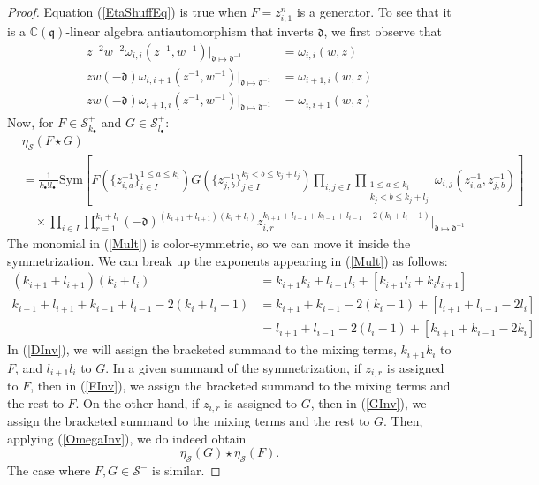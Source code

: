\documentclass{amsart}
\newcommand{\C}{\mathbb{C}}
\newcommand{\qqq}{\mathfrak{q}}
\newcommand{\ddd}{\mathfrak{d}}
\theoremstyle{remark}
\numberwithin{thm}{section}
\numberwithin{equation}{section}
\begin{document}
\begin{proof}
Equation (\ref{EtaShuffEq}) is true when $F=z_{i,1}^n$ is a generator.
To see that it is a $\C(\qqq)$-linear algebra antiautomorphism that inverts $\ddd$, we first observe that
\begin{equation}
 \begin{aligned}
    z^{-2}w^{-2}\omega_{i,i}(z^{-1},w^{-1})\bigg|_{\ddd\mapsto\ddd^{-1}}&=\omega_{i,i}(w,z)\\
    zw(-\ddd)\omega_{i,i+1}(z^{-1},w^{-1})\bigg|_{\ddd\mapsto\ddd^{-1}}&=\omega_{i+1,i}(w,z)\\
    zw(-\ddd)\omega_{i+1,i}(z^{-1}, w^{-1})\bigg|_{\ddd\mapsto\ddd^{-1}}&=\omega_{i,i+1}(w,z)
\end{aligned} 
\label{OmegaInv}
\end{equation}
Now, for $F\in\mathcal{S}_{k_\bullet}^+$ and $G\in\mathcal{S}_{l_\bullet}^+$:
\begin{align}
        \nonumber
        &\eta_{\mathcal{S}}(F\star G)\\
        \nonumber
        &=\frac{1}{k_\bullet!l_\bullet!}\mathrm{Sym}\left[F\left(\{z_{i,a}^{-1}\}_{i\in I}^{1\le a\le k_i}\right)
        G\left(\{z_{j,b}^{-1}\}_{j\in I}^{k_j<b\le k_j+l_j}\right)
        \prod_{i,j\in I}\prod_{\substack{1\le a\le k_i\\k_j<b\le k_j+l_j}}\omega_{i,j}(z_{i,a}^{-1},z_{j,b}^{-1})\right]\\
        \label{Mult}
        &\quad\times
        \prod_{i\in I}\prod_{r=1}^{k_i+l_i}(-\ddd)^{(k_{i+1}+l_{i+1})(k_i+l_i)} z_{i,r}^{k_{i+1}+l_{i+1}+k_{i-1}+l_{i-1}-2(k_i+l_i-1)}\bigg|_{\ddd\mapsto\ddd^{-1}}
\end{align}
The monomial in (\ref{Mult}) is color-symmetric, so we can move it inside the symmetrization.
We can break up the exponents appearing in (\ref{Mult}) as follows:
\begin{align}
\label{DInv}
    (k_{i+1}+l_{i+1})(k_i+l_i)&=k_{i+1}k_{i}+l_{i+1}l_i+\left[k_{i+1}l_i+k_il_{i+1}\right]\\
\label{FInv}
    k_{i+1}+l_{i+1}+k_{i-1}+l_{i-1}-2(k_i+l_i-1)&=k_{i+1}+k_{i-1}-2(k_i-1)+[l_{i+1}+l_{i-1}-2l_i]\\
\label{GInv}
    &=l_{i+1}+l_{i-1}-2(l_i-1)+[k_{i+1}+k_{i-1}-2k_i]
\end{align}
In (\ref{DInv}), we will assign the bracketed summand to the mixing terms, $k_{i+1}k_{i}$ to $F$, and $l_{i+1}l_i$ to $G$.
In a given summand of the symmetrization, if $z_{i,r}$ is assigned to $F$, then in (\ref{FInv}), we assign the bracketed summand to the mixing terms and the rest to $F$.
On the other hand, if $z_{i,r}$ is assigned to $G$, then in (\ref{GInv}), we assign the bracketed summand to the mixing terms and the rest to $G$.
Then, applying (\ref{OmegaInv}), we do indeed obtain
\[
\eta_{\mathcal{S}}(G)\star\eta_{\mathcal{S}}(F).
\]
The case where $F,G\in\mathcal{S}^-$ is similar.
\end{proof}
\end{document}
